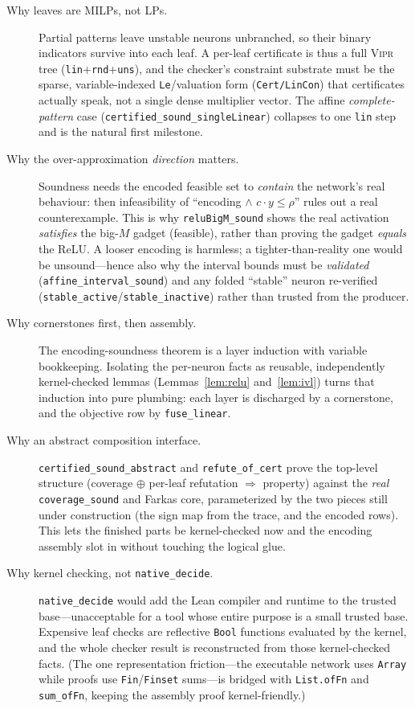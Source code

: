 \documentclass[runningheads]{llncs}
\newcommand{\vipr}{\textsc{Vipr}}
\newcommand{\code}[1]{\texttt{#1}}
\begin{document}
\begin{description}
  \item[Why leaves are MILPs, not LPs.] Partial patterns leave unstable neurons
    unbranched, so their binary indicators survive into each leaf. A per-leaf
    certificate is thus a full \vipr{} tree (\code{lin}+\code{rnd}+\code{uns}), and
    the checker's constraint substrate must be the sparse, variable-indexed
    \code{Le}/valuation form (\code{Cert/LinCon}) that certificates actually speak,
    not a single dense multiplier vector. The affine \emph{complete-pattern} case
    (\code{certified\_sound\_singleLinear}) collapses to one \code{lin} step and is
    the natural first milestone.

  \item[Why the over-approximation \emph{direction} matters.] Soundness needs the
    encoded feasible set to \emph{contain} the network's real behaviour: then
    infeasibility of ``encoding $\wedge$ $c\cdot y\le\rho$'' rules out a real
    counterexample. This is why \code{reluBigM\_sound} shows the real activation
    \emph{satisfies} the big-$M$ gadget (feasible), rather than proving the gadget
    \emph{equals} the ReLU. A looser encoding is harmless; a tighter-than-reality one
    would be unsound---hence also why the interval bounds must be \emph{validated}
    (\code{affine\_interval\_sound}) and any folded ``stable'' neuron re-verified
    (\code{stable\_active}/\code{stable\_inactive}) rather than trusted from the
    producer.

  \item[Why cornerstones first, then assembly.] The encoding-soundness theorem is a
    layer induction with variable bookkeeping. Isolating the per-neuron facts as
    reusable, independently kernel-checked lemmas (Lemmas~\ref{lem:relu}
    and~\ref{lem:ivl}) turns that induction into pure plumbing: each layer is
    discharged by a cornerstone, and the objective row by \code{fuse\_linear}.

  \item[Why an abstract composition interface.] \code{certified\_sound\_abstract}
    and \code{refute\_of\_cert} prove the top-level structure
    (coverage $\oplus$ per-leaf refutation $\Rightarrow$ property) against the
    \emph{real} \code{coverage\_sound} and Farkas core, parameterized by the two
    pieces still under construction (the sign map from the trace, and the encoded
    rows). This lets the finished parts be kernel-checked now and the encoding
    assembly slot in without touching the logical glue.

  \item[Why kernel checking, not \code{native\_decide}.] \code{native\_decide} would
    add the Lean compiler and runtime to the trusted base---unacceptable for a tool
    whose entire purpose is a small trusted base. Expensive leaf checks are reflective
    \code{Bool} functions evaluated by the kernel, and the whole checker result is
    reconstructed from those kernel-checked facts.
    (The one representation friction---the executable network uses \code{Array} while
    proofs use \code{Fin}/\code{Finset} sums---is bridged with \code{List.ofFn} and
    \code{sum\_ofFn}, keeping the assembly proof kernel-friendly.)
\end{description}
\end{document}
